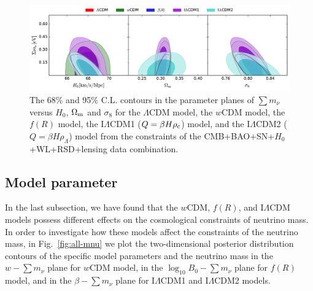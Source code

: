 \documentclass[aps,prd,nofootinbib,amsmath,amssymb,twocolumn,superscriptaddress,10pt]{revtex4}%
\newcommand{\update}[1]{\textcolor{purple}{#1}}
\begin{document}
\begin{figure}
\begin{center}
\includegraphics[scale=0.6, angle=0]{mnu-om-sig-h0-182.pdf}
\caption{The 68\% and 95\% C.L. contours in the parameter planes of $\sum m_{\nu}$ versus $H_{0}$, $\Omega_{\rm m}$ and $\sigma_{8}$ for the $\Lambda$CDM model, the $w$CDM model, the $f(R)$ model, the I$\Lambda$CDM1 ($Q=\beta H\rho_{\rm c}$) model, and the I$\Lambda$CDM2 ($Q=\beta H\rho_{\Lambda}$) model from the constraints of the CMB+BAO+SN+$H_{0}$+WL+RSD+lensing data combination.}
\label{fig:mnu-om-sig-h0}
\end{center}
\end{figure}



\subsection{Model parameter}\label{cosmologymodel}

In the last subsection, we have found that the $w$CDM, $f(R)$, and I$\Lambda$CDM models possess different effects on the cosmological constraints of neutrino mass. In order to investigate how these models affect the constraints of the neutrino mass, in Fig.~\ref{fig:all-mnu} we plot the two-dimensional posterior distribution contours of the specific model parameters and the neutrino mass in the $w-\sum m_{\nu}$ plane for $w$CDM model, in the $\log_{10}B_{0}-\sum m_{\nu}$ plane for $f(R)$ model, and in the $\beta-\sum m_{\nu}$ plane for I$\Lambda$CDM1 and I$\Lambda$CDM2 models. 

\end{document}
